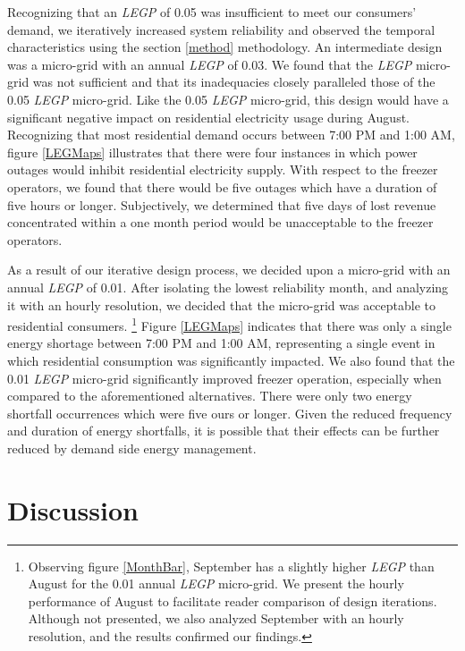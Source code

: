 \documentclass[11p]{article}
\begin{document}

Recognizing that an \emph{LEGP} of 0.05 was insufficient to meet our consumers' demand, we iteratively increased system reliability and observed the temporal characteristics using the section \ref{method} methodology.
An intermediate design was a micro-grid with an annual \emph{LEGP} of 0.03. 
We found that the \emph{LEGP} micro-grid was not sufficient and that its inadequacies closely paralleled those of the 0.05 \emph{LEGP} micro-grid.
Like the 0.05 \emph{LEGP} micro-grid, this design would have a significant negative impact on residential electricity usage during August.
Recognizing that most residential demand occurs between 7:00 PM and 1:00 AM, figure \ref{LEGMaps} illustrates that there were four instances in which power outages would inhibit residential electricity supply. 
With respect to the freezer operators, we found that there would be five outages which have a duration of five hours or longer. 
Subjectively, we determined that five days of lost revenue concentrated within a one month period would be unacceptable to the freezer operators. 

As a result of our iterative design process, we decided upon a micro-grid with an annual \emph{LEGP} of 0.01. After isolating the lowest reliability month, and analyzing it with an hourly resolution, we decided that the micro-grid was acceptable to residential consumers. 
%
%
\footnote{Observing figure \ref{MonthBar}, September has a slightly higher \emph{LEGP} than August for the 0.01 annual \emph{LEGP} micro-grid. 
We present the hourly performance of August to facilitate reader comparison of design iterations. 
Although not presented, we also analyzed September with an hourly resolution, and the results confirmed our findings.}
%
%
%
Figure \ref{LEGMaps} indicates that there was only a single energy shortage between 7:00 PM and 1:00 AM, representing a single event in which residential consumption was significantly impacted.
We also found that the 0.01 \emph{LEGP} micro-grid significantly improved freezer operation, especially when compared to the aforementioned alternatives. There were only two energy shortfall occurrences which were five ours or longer. 
Given the reduced frequency and duration of energy shortfalls, it is possible that their effects can be further reduced by demand side energy management.

\section{Discussion} \label{Discussion}
\end{document}
